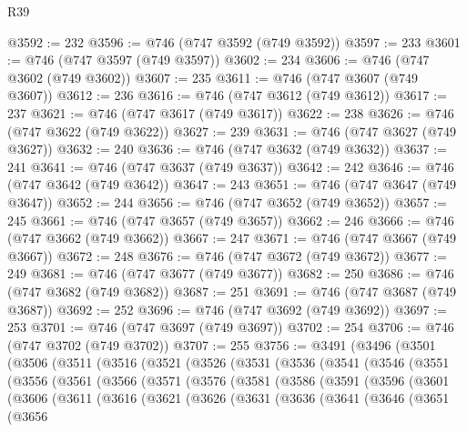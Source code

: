 \begin{lexlean}{R39}
\begin{coremodule}
@3592 := 232
@3596 := @746 (@747 @3592 (@749 @3592))
@3597 := 233
@3601 := @746 (@747 @3597 (@749 @3597))
@3602 := 234
@3606 := @746 (@747 @3602 (@749 @3602))
@3607 := 235
@3611 := @746 (@747 @3607 (@749 @3607))
@3612 := 236
@3616 := @746 (@747 @3612 (@749 @3612))
@3617 := 237
@3621 := @746 (@747 @3617 (@749 @3617))
@3622 := 238
@3626 := @746 (@747 @3622 (@749 @3622))
@3627 := 239
@3631 := @746 (@747 @3627 (@749 @3627))
@3632 := 240
@3636 := @746 (@747 @3632 (@749 @3632))
@3637 := 241
@3641 := @746 (@747 @3637 (@749 @3637))
@3642 := 242
@3646 := @746 (@747 @3642 (@749 @3642))
@3647 := 243
@3651 := @746 (@747 @3647 (@749 @3647))
@3652 := 244
@3656 := @746 (@747 @3652 (@749 @3652))
@3657 := 245
@3661 := @746 (@747 @3657 (@749 @3657))
@3662 := 246
@3666 := @746 (@747 @3662 (@749 @3662))
@3667 := 247
@3671 := @746 (@747 @3667 (@749 @3667))
@3672 := 248
@3676 := @746 (@747 @3672 (@749 @3672))
@3677 := 249
@3681 := @746 (@747 @3677 (@749 @3677))
@3682 := 250
@3686 := @746 (@747 @3682 (@749 @3682))
@3687 := 251
@3691 := @746 (@747 @3687 (@749 @3687))
@3692 := 252
@3696 := @746 (@747 @3692 (@749 @3692))
@3697 := 253
@3701 := @746 (@747 @3697 (@749 @3697))
@3702 := 254
@3706 := @746 (@747 @3702 (@749 @3702))
@3707 := 255
@3756 := @3491
    (@3496
      (@3501
        (@3506
          (@3511
            (@3516
              (@3521
                (@3526
                  (@3531
                    (@3536
                      (@3541
                        (@3546
                          (@3551
                            (@3556
                              (@3561
                                (@3566
                                  (@3571
                                    (@3576
                                      (@3581
                                        (@3586
                                          (@3591
                                            (@3596
                                              (@3601
                                                (@3606
                                                  (@3611
                                                    (@3616
                                                      (@3621
                                                        (@3626
                                                          (@3631
                                                            (@3636
                                                              (@3641
                                                                (@3646
                                                                  (@3651
                                                                    (@3656

\end{coremodule}
\end{lexlean}
